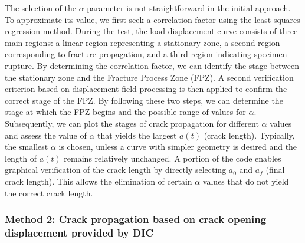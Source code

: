 \documentclass[3p,times,procedia]{elsarticle}
\begin{document}


The selection of the $\alpha$ parameter is not straightforward in the initial approach. To approximate its value, we first seek a correlation factor using the least squares regression method. During the test, the load-displacement curve consists of three main regions: a linear region representing a stationary zone, a second region corresponding to fracture propagation, and a third region indicating specimen rupture. By determining the correlation factor, we can identify the stage between the stationary zone and the Fracture Process Zone (FPZ). A second verification criterion based on displacement field processing is then applied to confirm the correct stage of the FPZ. By following these two steps, we can determine the stage at which the FPZ begins and the possible range of values for $\alpha$. Subsequently, we can plot the stages of crack propagation for different $\alpha$ values and assess the value of $\alpha$ that yields the largest $a(t)$ (crack length). Typically, the smallest $\alpha$ is chosen, unless a curve with simpler geometry is desired and the length of $a(t)$ remains relatively unchanged. A portion of the code enables graphical verification of the crack length by directly selecting $a_0$ and $a_f$ (final crack length). This allows the elimination of certain $\alpha$ values that do not yield the correct crack length.

\subsubsection{Method 2: Crack propagation based on crack opening displacement provided by DIC}
\end{document}
